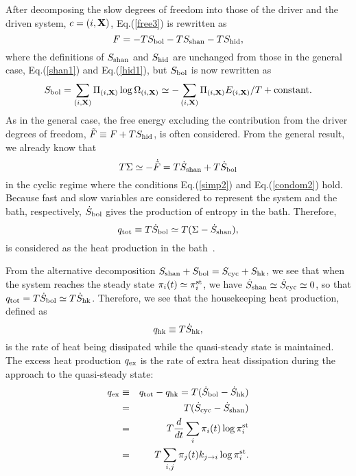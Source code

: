 \documentclass[aps,pre,amsmath,amssymb,floatfix,preprint,nofootinbib]{revtex4}
\begin{document}
After decomposing the slow degrees of freedom into those of the driver and the driven system, $c=(i,{\bf X})$, Eq.(\ref{free3}) is rewritten as
\begin{equation}
F = -T S_{\rm bol}-T S_{\rm shan}-T S_{\rm hid}, \label{dcmp4} 
\end{equation} 
where the definitions of $S_{\rm shan}$ and $S_{\rm hid}$ are unchanged from those in the general case, Eq.(\ref{shan1}) and Eq.(\ref{hid1}), but $S_{\rm bol}$ is now rewritten as
\begin{equation}
S_{\rm bol} = \sum_{(i,{\bf X})} \Pi_{(i,{\bf X})} \log \Omega_{(i,{\bf X})}  \simeq - \sum_{(i,{\bf X})} \Pi_{(i,{\bf X})} E_{(i,{\bf X})}/T +{\rm constant}.
\end{equation}
As in the general case, the free energy excluding the contribution from the driver degrees of freedom,  $\tilde F \equiv F + T S_{\rm hid}$, is often considered. From the general result, we already know that
\begin{equation}
T \Sigma \simeq -\dot {\tilde F} =  T \dot S_{\rm shan} + T \dot S_{\rm bol} 
\end{equation}
in the cyclic regime where the conditions Eq.(\ref{simp2}) and Eq.(\ref{condom2}) hold. Because fast and slow variables are considered to represent the system and the bath, respectively, $\dot S_{\rm bol}$ gives the production of entropy in the bath. Therefore, 
\begin{equation}
q_{\rm tot} \equiv T \dot S_{\rm bol} \simeq T (\Sigma - \dot S_{\rm shan}), \label{theh}
\end{equation}
is considered as the heat production in the bath~\cite{seif1,seif2,hg,gq,hs,sp}.

From the alternative decomposition $S_{\rm shan} + S_{\rm bol} = S_{\rm cyc} + S_{\rm hk}$, we see that when the system reaches the steady state $\pi_i(t) \simeq \pi^{\rm st}_i$, we have $\dot S_{\rm shan} \simeq \dot S_{\rm cyc} \simeq 0$, so that $q_{\rm tot}= T \dot S_{\rm bol} \simeq T \dot S_{\rm hk}$. Therefore,  we see that the housekeeping heat production, defined as
\begin{equation}
q_{\rm hk} \equiv T \dot S_{\rm hk}, 
\end{equation}
is the rate of heat being dissipated while the quasi-steady state is maintained. The excess heat production $q_{\rm ex}$ is the rate of extra heat dissipation during the approach to the quasi-steady state:
\begin{eqnarray}
q_{\rm ex} &\equiv& q_{\rm tot} - q_{\rm hk} = T (\dot S_{\rm bol} - \dot S_{\rm hk})\nonumber\\
&=& T (\dot S_{\rm cyc} - \dot S_{\rm shan})\nonumber\\
&=& T \frac{d}{dt}\sum_i \pi_i(t) \log \pi^{\rm st}_i \nonumber\\
&=& T \sum_{i,j} \pi_j(t) k_{j \to i} \log \pi^{\rm st}_i. \label{qex}
\end{eqnarray}
\end{document}
